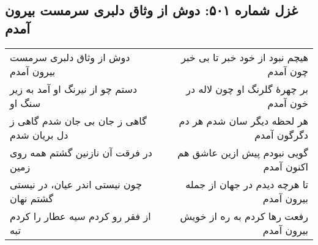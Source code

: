 \begin{center}
\section*{غزل شماره ۵۰۱: دوش از وثاق دلبری سرمست بیرون آمدم}
\label{sec:501}
\begin{longtable}{l p{0.5cm} r}
دوش از وثاق دلبری سرمست بیرون آمدم
&&
هیچم نبود از خود خبر تا بی خبر چون آمدم
\\
دستم چو از نیرنگ او آمد به زیر سنگ او
&&
بر چهرهٔ گلرنگ او چون لاله در خون آمدم
\\
گاهی ز جان بی جان شدم گاهی ز دل بریان شدم
&&
هر لحظه دیگر سان شدم هر دم دگرگون آمدم
\\
در فرقت آن نازنین گشتم همه روی زمین
&&
گویی نبودم پیش ازین عاشق هم اکنون آمدم
\\
چون نیستی اندر عیان، در نیستی گشتم نهان
&&
تا هرچه دیدم در جهان از جمله بیرون آمدم
\\
از فقر رو کردم سیه عطار را کردم تبه
&&
رفعت رها کردم به ره از خویش بیرون آمدم
\\
\end{longtable}
\end{center}

